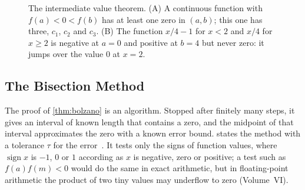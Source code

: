 \begin{figure}
\hfill
{}
\caption{The intermediate value theorem. (A) A continuous function with $f(a)<0<f(b)$ has at least one zero in $(a,b)$; this one has three, $c_1$, $c_2$ and $c_3$. (B) The function $x/4-1$ for $x<2$ and $x/4$ for $x\ge2$ is negative at $a=0$ and positive at $b=4$ but never zero: it jumps over the value $0$ at $x=2$.}
\label{fig:ivt}
\end{figure}

\subsection{The Bisection Method}

The proof of \cref{thm:bolzano} is an algorithm. Stopped after finitely many steps, it gives an interval of known length that contains a zero, and the midpoint of that interval approximates the zero with a known error bound.  states the method with a tolerance $\tau$ for the error~\cite{suli2003}. It tests only the signs of function values, where $\operatorname{sign}x$ is $-1$, $0$ or $1$ according as $x$ is negative, zero or positive; a test such as $f(a)f(m)<0$ would do the same in exact arithmetic, but in floating-point arithmetic the product of two tiny values may underflow to zero (Volume~VI).

